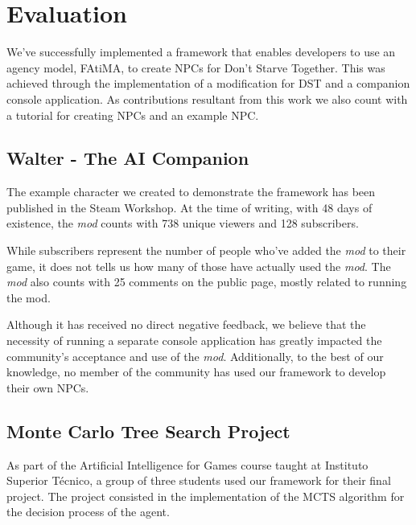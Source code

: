 \section{Evaluation}

We've successfully implemented a framework that enables developers to use an agency model, FAtiMA, to create NPCs for Don't Starve Together.
This was achieved through the implementation of a modification for DST and a companion console application.
As contributions resultant from this work we also count with a tutorial for creating NPCs and an example NPC.

\subsection{Walter - The AI Companion}

The example character we created to demonstrate the framework has been published in the Steam Workshop.
At the time of writing, with 48 days of existence, the \textit{mod} counts with 738 unique viewers and 128 subscribers.

While subscribers represent the number of people who've added the \textit{mod} to their game, it does not tells us how many of those have actually used the \textit{mod}.
The \textit{mod} also counts with 25 comments on the public page, mostly related to running the mod.

Although it has received no direct negative feedback, we believe that the necessity of running a separate console application has greatly impacted the community's acceptance and use of the \textit{mod}.
Additionally, to the best of our knowledge, no member of the community has used our framework to develop their own NPCs.


\subsection{Monte Carlo Tree Search Project}

As part of the Artificial Intelligence for Games course taught at Instituto Superior Técnico, a group of three students used our framework for their final project.
The project consisted in the implementation of the MCTS algorithm for the decision process of the agent.

